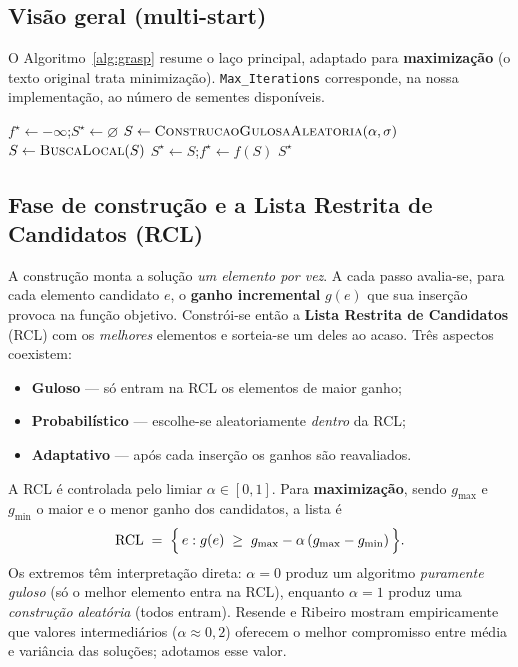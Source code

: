 \documentclass[11pt,a4paper]{article}
\begin{document}
\subsection{Visão geral (multi-start)}

O Algoritmo~\ref{alg:grasp} resume o laço principal, adaptado para
\textbf{maximização} (o texto original trata minimização). \texttt{Max\_Iterations}
corresponde, na nossa implementação, ao número de sementes disponíveis.

\begin{algorithm}[ht]
\caption{GRASP (versão de maximização)}
\label{alg:grasp}
\begin{algorithmic}[1]
\State $f^\star \gets -\infty$;\quad $S^\star \gets \varnothing$
  \State $S \gets \textsc{ConstrucaoGulosaAleatoria}(\alpha,\sigma)$
  \State $S \gets \textsc{BuscaLocal}(S)$
    \State $S^\star \gets S$;\quad $f^\star \gets f(S)$
  \EndIf
\EndFor
\State \Return $S^\star$
\end{algorithmic}
\end{algorithm}

\subsection{Fase de construção e a Lista Restrita de Candidatos (RCL)}

A construção monta a solução \emph{um elemento por vez}. A cada passo
avalia-se, para cada elemento candidato $e$, o \textbf{ganho incremental}
$g(e)$ que sua inserção provoca na função objetivo. Constrói-se então a
\textbf{Lista Restrita de Candidatos} (RCL) com os \emph{melhores} elementos e
sorteia-se um deles ao acaso. Três aspectos coexistem:

\begin{itemize}
\item \textbf{Guloso} --- só entram na RCL os elementos de maior ganho;
\item \textbf{Probabilístico} --- escolhe-se aleatoriamente \emph{dentro} da RCL;
\item \textbf{Adaptativo} --- após cada inserção os ganhos são reavaliados.
\end{itemize}

A RCL é controlada pelo limiar $\alpha\in[0,1]$. Para \textbf{maximização}, sendo
$g_{\max}$ e $g_{\min}$ o maior e o menor ganho dos candidatos, a lista é
\begin{equation}
\mathrm{RCL} \;=\;\Bigl\{\, e : g(e) \;\ge\; g_{\max} - \alpha\,(g_{\max}-g_{\min}) \,\Bigr\}.
\label{eq:rcl}
\end{equation}
Os extremos têm interpretação direta: $\alpha=0$ produz um algoritmo
\emph{puramente guloso} (só o melhor elemento entra na RCL), enquanto $\alpha=1$
produz uma \emph{construção aleatória} (todos entram). Resende e Ribeiro mostram
empiricamente que valores intermediários ($\alpha\approx 0{,}2$) oferecem o melhor
compromisso entre média e variância das soluções; adotamos esse valor.
\end{document}
